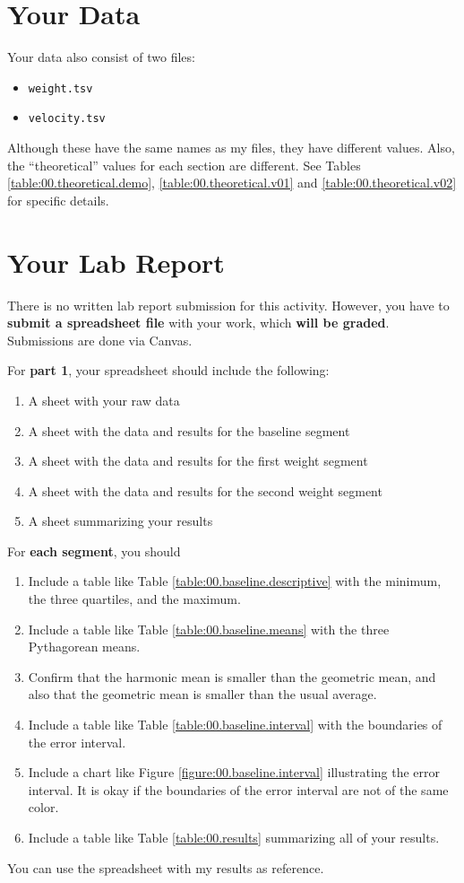 \section{Your Data}
Your data also consist of two files:
\begin{itemize}
    \item \texttt{weight.tsv}
    \item \texttt{velocity.tsv}
\end{itemize}
Although these have the same names as my files, they have different values. Also, the ``theoretical'' values for each section are different. See Tables \ref{table:00.theoretical.demo}, \ref{table:00.theoretical.v01} and \ref{table:00.theoretical.v02} for specific details.
\section{Your Lab Report}
There is no written lab report submission for this activity. However, you have to \textbf{submit a spreadsheet file} with your work, which \textbf{will be graded}. Submissions are done via Canvas.

For \textbf{part 1}, your spreadsheet should include the following:
\begin{enumerate}
    \item A sheet with your raw data
    \item A sheet with the data and results for the baseline segment
    \item A sheet with the data and results for the first weight segment
    \item A sheet with the data and results for the second weight segment
    \item A sheet summarizing your results
\end{enumerate}
For \textbf{each segment}, you should
\begin{enumerate}
    \item Include a table like Table \ref{table:00.baseline.descriptive} with the minimum, the three quartiles, and the maximum.
    \item Include a table like Table \ref{table:00.baseline.means} with the three Pythagorean means.
    \item Confirm that the harmonic mean is smaller than the geometric mean, and also that the geometric mean is smaller than the usual average.
    \item Include a table like Table \ref{table:00.baseline.interval} with the boundaries of the error interval.
    \item Include a chart like Figure \ref{figure:00.baseline.interval} illustrating the error interval. It is okay if the boundaries of the error interval are not of the same color.
    \item Include a table like Table \ref{table:00.results} summarizing all of your results.
\end{enumerate}
You can use the spreadsheet with my results as reference.

